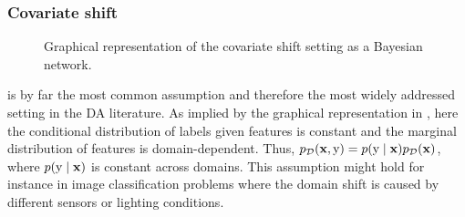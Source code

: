 \subsubsection{Covariate shift}
\label{sec:cov_shift_sota}
\begin{figure}
    \centering
    \caption{Graphical representation of the covariate shift setting as a Bayesian network.}
    \label{fig:cov_shift}
\end{figure}
 is by far the most common assumption and therefore the most widely addressed setting in the DA literature. As implied by the graphical representation in , here the conditional distribution of labels given features is constant and the marginal distribution of features is domain-dependent. Thus, $p_{\mathcal{D}}({\mathbf{x}}, {\textnormal{y}}) = p({\textnormal{y}} \mid {\mathbf{x}}) p_{\mathcal{D}}({\mathbf{x}})$, where $p({\textnormal{y}} \mid {\mathbf{x}})$ is constant across domains. This assumption might hold for instance in image classification problems where the domain shift is caused by different sensors or lighting conditions.

